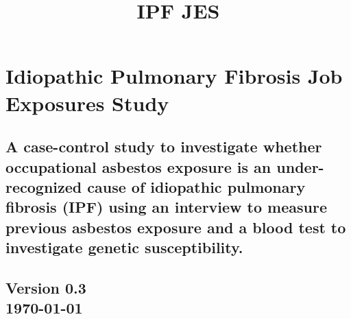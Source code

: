 \documentclass[a4paper,10pt]{article}
\title{\bf IPF JES}
\date{}
\begin{document}
\pagestyle{fancy} 


\maketitle



\section*{Idiopathic Pulmonary Fibrosis Job Exposures Study}
 \subsection*{A case-control study to investigate whether occupational asbestos exposure is an under-recognized cause of idiopathic pulmonary fibrosis (IPF) using an interview to measure previous
asbestos exposure and a blood test to investigate genetic susceptibility.}


\begin{centering}
\subsection*{Version 0.3 \\ \today}
\end{centering}
\end{document}
